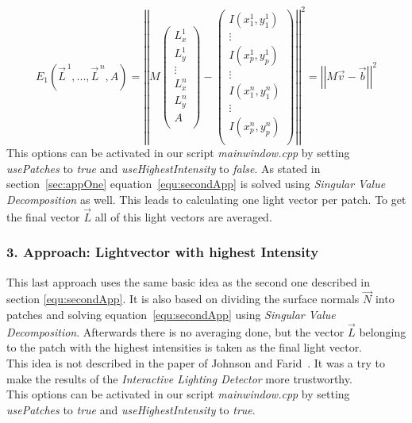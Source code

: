 \begin{equation}
\label{equ:secondApp}
E_{1}(\vec{L}^{\,1} , ... , \vec{L}^{\,n} , A) = 
\left\vert \left\vert 
M
\begin{pmatrix}
L^{1}_{x} \\
L^{1}_{y} \\
\vdots  \\
L^{n}_{x} \\
L^{n}_{y} \\
A \\
\end{pmatrix} -
\begin{pmatrix}
I(x^{1}_{1} , y^{1}_{1}) \\
\vdots  \\
I(x^{1}_{p} , y^{1}_{p}) \\
\vdots  \\
I(x^{n}_{1} , y^{n}_{1}) \\
\vdots  \\
I(x^{n}_{p} , y^{n}_{p}) \\
\end{pmatrix}
 \right\vert\right\vert^{2}
 = \left\vert \left\vert  M\vec{v}-\vec{b}  \right\vert\right\vert^{2}
\end{equation}
This options can be activated in our script \textit{mainwindow.cpp} by setting \textit{usePatches} to \textit{true} and \textit{useHighestIntensity} to \textit{false}.
As stated in section~\ref{sec:appOne} equation~\ref{equ:secondApp} is solved using \textit{Singular Value Decomposition} as well. This leads to calculating one light vector per patch. To get the final vector $\vec{L}$ all of this light vectors are averaged.


\subsubsection{3. Approach: Lightvector with highest Intensity}\label{sec:appThree}
This last approach uses the same basic idea as the second one described in section \ref{equ:secondApp}. It is also based on dividing the surface normals $\vec{N}$ into patches and solving equation~\ref{equ:secondApp} using \textit{Singular Value Decomposition}. Afterwards there is no averaging done, but the vector $\vec{L}$ belonging to the patch with the highest intensities is taken as the final light vector. \\
This idea is not described in the paper of Johnson and Farid~\cite{Johnson}. It was a try to make the results of the \textit{Interactive Lighting Detector} more trustworthy. \\
This options can be activated in our script \textit{mainwindow.cpp} by setting \textit{usePatches} to \textit{true} and \textit{useHighestIntensity} to \textit{true}.

\newpage